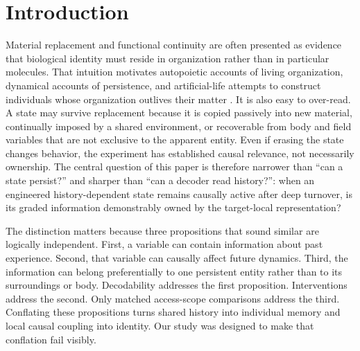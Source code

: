 \documentclass[11pt]{article}
\begin{document}
\begin{abstract}
\noindent\textbf{Interpretation.}
An engineered experience-dependent state can remain causally active through deep material replacement without satisfying a preregistered criterion for exclusive target-local ownership. Within the tested C1c architecture, causal persistence is therefore insufficient for individual memory. The result does not show that all distributed encodings or all architectures fail, nor does it establish identity, active reconstruction, reproduction, heredity, evolution, or life.
\end{abstract}

\section{Introduction}

Material replacement and functional continuity are often presented as evidence that biological identity must reside in organization rather than in particular molecules. That intuition motivates autopoietic accounts of living organization, dynamical accounts of persistence, and artificial-life attempts to construct individuals whose organization outlives their matter \citep{varela1974,maturana1980,godfreysmith2009,bedau2000}. It is also easy to over-read. A state may survive replacement because it is copied passively into new material, continually imposed by a shared environment, or recoverable from body and field variables that are not exclusive to the apparent entity. Even if erasing the state changes behavior, the experiment has established causal relevance, not necessarily ownership. The central question of this paper is therefore narrower than ``can a state persist?'' and sharper than ``can a decoder read history?'': when an engineered history-dependent state remains causally active after deep turnover, is its graded information demonstrably owned by the target-local representation?

The distinction matters because three propositions that sound similar are logically independent. First, a variable can contain information about past experience. Second, that variable can causally affect future dynamics. Third, the information can belong preferentially to one persistent entity rather than to its surroundings or body. Decodability addresses the first proposition. Interventions address the second. Only matched access-scope comparisons address the third. Conflating these propositions turns shared history into individual memory and local causal coupling into identity. Our study was designed to make that conflation fail visibly.
\end{document}
